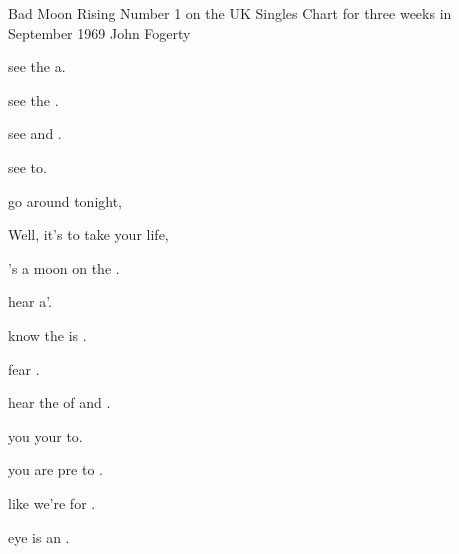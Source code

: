 \begin{SBSong}{Bad Moon Rising}
  {Number 1 on the UK Singles Chart for three weeks in September 1969}
  {John Fogerty}
  \begin{SBVerse}
     see the   a.

     see   the .

     see  and .

     see   to.
  \end{SBVerse}
  \begin{SBChorus}
     go around tonight,

    Well, it's  to take your life,

    's a  moon on the .
  \end{SBChorus}
  \begin{SBVerse}
     hear  a'.

     know the  is  .

     fear   .

     hear the  of  and .
  \end{SBVerse}
  \begin{SBVerse}
     you  your  to.

     you are  pre to .

     like we're  for  .

     eye is   an .
  \end{SBVerse}
\end{SBSong}


